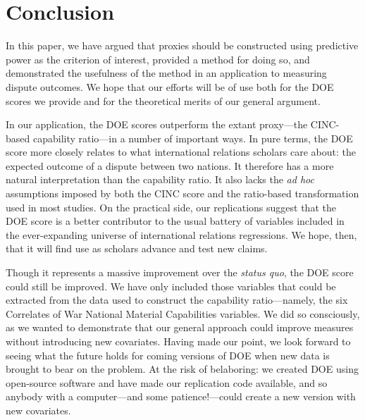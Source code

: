 \section{Conclusion}
\label{sec:conclusion}

In this paper, we have argued that proxies should be constructed using predictive power as the criterion of interest, provided a method for doing so, and demonstrated the usefulness of the method in an application to measuring dispute outcomes. 
We hope that our efforts will be of use both for the DOE scores we provide and for the theoretical merits of our general argument.

In our application, the DOE scores outperform the extant proxy---the CINC-based capability ratio---in a number of important ways. 
In pure terms, the DOE score more closely relates to what international relations scholars care about: the expected outcome of a dispute between two nations. 
It therefore has a more natural interpretation than the capability ratio. 
It also lacks the \emph{ad hoc} assumptions imposed by both the CINC score and the ratio-based transformation used in most studies. 
On the practical side, our replications suggest that the DOE score is a better contributor to the usual battery of variables included in the ever-expanding universe of international relations regressions. 
We hope, then, that it will find use as scholars advance and test new claims.  

Though it represents a massive improvement over the \emph{status quo}, the DOE score could still be improved. 
We have only included those variables that could be extracted from the data used to construct the capability ratio---namely, the six Correlates of War National Material Capabilities variables. 
We did so consciously, as we wanted to demonstrate that our general approach could improve measures without introducing new covariates. 
Having made our point, we look forward to seeing what the future holds for coming versions of DOE when new data is brought to bear on the problem. 
At the risk of belaboring: we created DOE using open-source software and have made our replication code available, and so anybody with a computer---and some patience!---could create a new version with new covariates.

